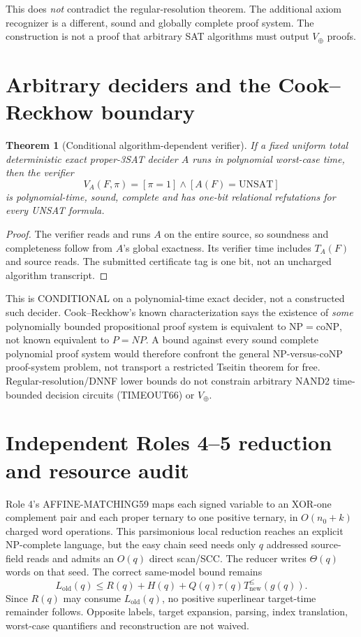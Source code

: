 \documentclass[11pt]{article}
\newtheorem{theorem}{Theorem}
\begin{document}
This does \emph{not} contradict the regular-resolution theorem.
The additional axiom recognizer is a different,
sound and globally complete proof system. The construction
is not a proof that arbitrary SAT algorithms must output
$V_{\oplus}$ proofs.

\section{Arbitrary deciders and the Cook--Reckhow boundary}
\begin{theorem}[Conditional algorithm-dependent verifier]
If a fixed uniform total deterministic exact proper-3SAT
decider $A$ runs in polynomial worst-case time, then the verifier
\[
V_A(F,\pi)=[\pi=1]\wedge[A(F)=\mathrm{UNSAT}]
\]
is polynomial-time, sound, complete and has one-bit relational
refutations for \emph{every} UNSAT formula.
\end{theorem}
\begin{proof}
The verifier reads and runs $A$ on the entire source, so
soundness and completeness follow from $A$'s global exactness.
Its verifier time includes $T_A(F)$ and source reads.
The submitted certificate tag is one bit, not an uncharged
algorithm transcript.
\end{proof}

This is CONDITIONAL on a polynomial-time exact decider,
not a constructed such decider. Cook--Reckhow's known
characterization says the existence of \emph{some}
polynomially bounded propositional proof system is equivalent
to $\mathrm{NP}=\mathrm{coNP}$, not known equivalent to
$P=NP$. A bound against every sound complete polynomial
proof system would therefore confront the general
NP-versus-coNP proof-system problem, not transport a
restricted Tseitin theorem for free.
Regular-resolution/DNNF lower bounds do not constrain
arbitrary NAND2 time-bounded decision circuits (TIMEOUT66)
or $V_{\oplus}$.

\section{Independent Roles 4--5 reduction and resource audit}
Role 4's AFFINE-MATCHING59 maps each signed variable to an
XOR-one complement pair and each proper ternary to one positive
ternary, in $O(n_0+k)$ charged word operations. This parsimonious
local reduction reaches an explicit NP-complete language, but
the easy chain seed needs only $q$ addressed source-field
reads and admits an $O(q)$ direct scan/SCC.
The reducer writes $\Theta(q)$ words on that seed.
The correct same-model bound remains
\[
L_{\mathrm{old}}(q)\le R(q)+H(q)+Q(q)\tau(q)
T_{\mathrm{new}}^{\le}(g(q)).
\]
Since $R(q)$ may consume $L_{\mathrm{old}}(q)$, no positive
superlinear target-time remainder follows. Opposite labels,
target expansion, parsing, index translation, worst-case
quantifiers and reconstruction are not waived.
\end{document}
